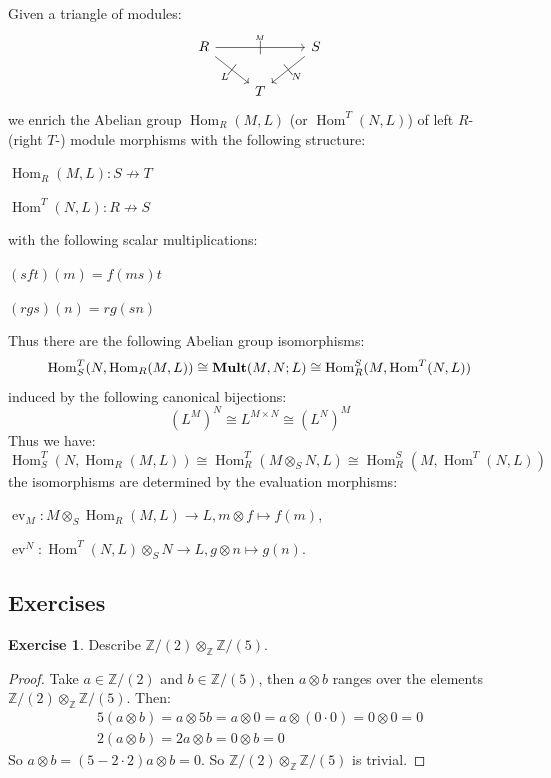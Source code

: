 \documentclass[8pt]{article}
\theoremstyle{definition}
\theoremstyle{definition}
\theoremstyle{definition}
\theoremstyle{definition}
\theoremstyle{definition}
\theoremstyle{definition}
\theoremstyle{definition}
\theoremstyle{definition}
\theoremstyle{definition}
\theoremstyle{definition}
\theoremstyle{definition}
\theoremstyle{definition}
\theoremstyle{definition}
\newtheorem{exercise}{Exercise}[section]
\theoremstyle{definition}
\theoremstyle{question}
\begin{document}
Given a triangle of modules:
\[
\begin{tikzcd}
  R \ar[rr, "{}^M", "|" marking] \ar[dr, "L"', "|" marking] && S \ar[dl, "N", "|" marking] \\
  & T
\end{tikzcd}
\]
we enrich the Abelian group $\operatorname{Hom}_R(M, L)$ (or $\operatorname{Hom}^T(N, L)$)
of left $R$- (right $T$-) module morphisms with the following structure:
\begin{center}
  $\operatorname{Hom}_R(M, L) : S \not\to T$

  $\operatorname{Hom}^T(N, L) : R \not\to S$
\end{center}
with the following scalar multiplications:
\begin{center}
  $(s f t)(m) = f (m s) t$

  $(r g s)(n) = r g (s n)$
\end{center}
Thus there are the following Abelian group isomorphisms:
\[
\operatorname{Hom}^T_S(N, \operatorname{Hom}_R(M, L)) \cong {\bf Mult}(M, N; L) \cong \operatorname{Hom}^S_R(M, \operatorname{Hom}^T(N, L))
\]
induced by the following canonical bijections:
\[
(L^M)^N \cong L^{M \times N} \cong (L^N)^M
\]
Thus we have:
\[
\operatorname{Hom}^T_S(N, \operatorname{Hom}_R(M, L)) \cong \operatorname{Hom}^T_R(M \otimes_S N, L) \cong \operatorname{Hom}^S_R(M, \operatorname{Hom}^T(N, L))
\]
the isomorphisms are determined by the evaluation morphisms:
\begin{center}
  $\operatorname{ev}_M : M \otimes_S \operatorname{Hom}_R(M, L) \to L, m \otimes f \mapsto f(m)$,

  $\operatorname{ev}^N : \operatorname{Hom}^T(N, L) \otimes_S N \to L, g \otimes n \mapsto g(n)$.
\end{center}

\subsection{Exercises}

\begin{exercise}
  Describe $\mathbb{Z}/(2) \otimes_{\mathbb{Z}} \mathbb{Z}/(5)$.
\end{exercise}

\begin{proof}
  Take $a \in \mathbb{Z}/(2)$ and $b \in \mathbb{Z}/(5)$, then $a \otimes b$ ranges over the elements $\mathbb{Z}/(2) \otimes_{\mathbb{Z}} \mathbb{Z}/(5)$.
  Then:
  \[
  \begin{array}{lll}
    & 5 (a \otimes b) = a \otimes 5 b = a \otimes 0 = a \otimes (0 \cdot 0) = 0 \otimes 0 = 0& \\
    & 2 (a \otimes b) = 2 a \otimes b = 0 \otimes b = 0&
  \end{array}
  \]
  So $a \otimes b = (5 - 2 \cdot 2) a \otimes b = 0$.
  So $\mathbb{Z}/(2) \otimes_{\mathbb{Z}} \mathbb{Z}/(5)$ is trivial.
\end{proof}
\end{document}
